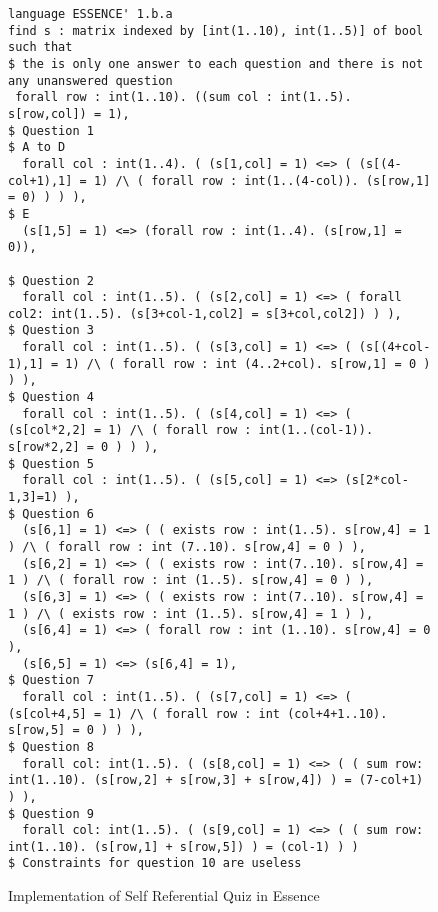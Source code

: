 \begin{figure}[ht]
\caption{\label{srq-essence-implementation}Implementation of Self Referential Quiz in Essence}
\begin{lstlisting}
language ESSENCE' 1.b.a
find s : matrix indexed by [int(1..10), int(1..5)] of bool
such that
$ the is only one answer to each question and there is not any unanswered question
 forall row : int(1..10). ((sum col : int(1..5). s[row,col]) = 1),
$ Question 1
$ A to D
  forall col : int(1..4). ( (s[1,col] = 1) <=> ( (s[(4-col+1),1] = 1) /\ ( forall row : int(1..(4-col)). (s[row,1] = 0) ) ) ),
$ E
  (s[1,5] = 1) <=> (forall row : int(1..4). (s[row,1] = 0)),

$ Question 2
  forall col : int(1..5). ( (s[2,col] = 1) <=> ( forall col2: int(1..5). (s[3+col-1,col2] = s[3+col,col2]) ) ),
$ Question 3
  forall col : int(1..5). ( (s[3,col] = 1) <=> ( (s[(4+col-1),1] = 1) /\ ( forall row : int (4..2+col). s[row,1] = 0 ) ) ),
$ Question 4
  forall col : int(1..5). ( (s[4,col] = 1) <=> ( (s[col*2,2] = 1) /\ ( forall row : int(1..(col-1)). s[row*2,2] = 0 ) ) ),
$ Question 5
  forall col : int(1..5). ( (s[5,col] = 1) <=> (s[2*col-1,3]=1) ),
$ Question 6
  (s[6,1] = 1) <=> ( ( exists row : int(1..5). s[row,4] = 1 ) /\ ( forall row : int (7..10). s[row,4] = 0 ) ),
  (s[6,2] = 1) <=> ( ( exists row : int(7..10). s[row,4] = 1 ) /\ ( forall row : int (1..5). s[row,4] = 0 ) ),
  (s[6,3] = 1) <=> ( ( exists row : int(7..10). s[row,4] = 1 ) /\ ( exists row : int (1..5). s[row,4] = 1 ) ),
  (s[6,4] = 1) <=> ( forall row : int (1..10). s[row,4] = 0 ),
  (s[6,5] = 1) <=> (s[6,4] = 1),
$ Question 7
  forall col : int(1..5). ( (s[7,col] = 1) <=> ( (s[col+4,5] = 1) /\ ( forall row : int (col+4+1..10). s[row,5] = 0 ) ) ),
$ Question 8
  forall col: int(1..5). ( (s[8,col] = 1) <=> ( ( sum row: int(1..10). (s[row,2] + s[row,3] + s[row,4]) ) = (7-col+1) ) ),
$ Question 9
  forall col: int(1..5). ( (s[9,col] = 1) <=> ( ( sum row: int(1..10). (s[row,1] + s[row,5]) ) = (col-1) ) )
$ Constraints for question 10 are useless
\end{lstlisting} 
\end{figure}


